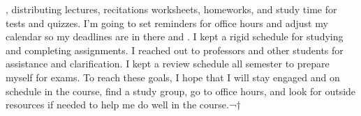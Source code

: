 , distributing lectures, recitations worksheets, homeworks, and study time for tests and quizzes.
I'm going to set reminders for office hours and adjust my calendar so my deadlines are in there and .
I kept a rigid schedule for studying and completing assignments. I reached out to professors and other students for assistance and clarification. I kept a review schedule all semester to prepare myself for exams.
To reach these goals, I hope that I will stay engaged and on schedule in the course, find a study group, go to office hours, and look for outside resources if needed to help me do well in the course.¬†


